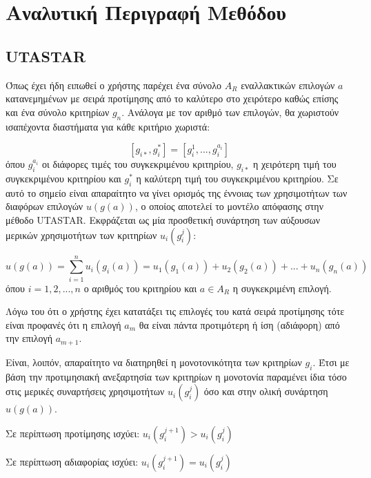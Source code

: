 \documentclass[11pt,a4paper,titlepage]{article}
\numberwithin{equation}{section}
\begin{document}
\newpage

\section{Αναλυτική Περιγραφή Μεθόδου}
\label{sec:theory_in_depth}
\subsection{UTASTAR}
Όπως έχει ήδη ειπωθεί ο χρήστης παρέχει ένα σύνολο $A_{R}$ εναλλακτικών επιλογών $a$ κατανεμημένων με σειρά προτίμησης από το καλύτερο στο χειρότερο καθώς επίσης και ένα σύνολο κριτηρίων $g_{n}$. Ανάλογα με τον αριθμό των επιλογών, θα χωριστούν ισαπέχοντα διαστήματα για κάθε κριτήριο χωριστά: 

\begin{equation}\label{initial_inter}
[g_{i*},g^{*}_{i}] = [g^{1}_{i}, ..., g^{a_{i}}_{i}]
\end{equation}
όπου $g^{a_{i}}_{i}$ οι διάφορες τιμές του συγκεκριμένου κριτηρίου, $g_{i*}$ η χειρότερη τιμή του συγκεκριμένου κριτηρίου και $g^{*}_{i}$ η καλύτερη τιμή του συγκεκριμένου κριτηρίου. 	
Σε αυτό το σημείο είναι απαραίτητο να γίνει ορισμός της έννοιας των χρησιμοτήτων των διαφόρων επιλογών $u(g(a))$, ο οποίος αποτελεί το μοντέλο απόφασης στην μέθοδο UTASTAR. Eκφράζεται ως μία προσθετική συνάρτηση των αύξουσων μερικών χρησιμοτήτων των κριτηρίων $u_{i}(g^{j}_{i})$:

\begin{equation}\label{total_uti}
	u(g(a)) = \sum_{i=1}^{n} u_{i}(g_{i}(a)) = u_{1}(g_{1}(a)) + u_{2}(g_{2}(a)) + ... + u_{n}(g_{n}(a))
\end{equation}
όπου $i = 1,2,...,n$ ο αριθμός του κριτηρίου και $a\in A_{R}$ η συγκεκριμένη επιλογή.

Λόγω του ότι ο χρήστης έχει κατατάξει τις επιλογές του κατά σειρά προτίμησης τότε είναι προφανές ότι η επιλογή $a_{m}$ θα είναι πάντα προτιμότερη ή ίση (αδιάφορη) από την επιλογή $a_{m+1}$.    

Είναι, λοιπόν, απαραίτητο να διατηρηθεί η μονοτονικότητα των κριτηρίων $g_{i}$. Έτσι με βάση την προτιμησιακή ανεξαρτησία των κριτηρίων η μονοτονία παραμένει ίδια τόσο στις μερικές συναρτήσεις χρησιμοτήτων $u_{i}(g^{j}_{i})$ όσο και στην ολική συνάρτηση  $u(g(a))$.

\centerline{Σε περίπτωση προτίμησης ισχύει: $u_{i}(g^{j+1}_{i}) > u_{i}(g^{j}_{i})$}

\centerline{Σε περίπτωση αδιαφορίας ισχύει: $u_{i}(g^{j+1}_{i}) = u_{i}(g^{j}_{i})$}
\end{document}
